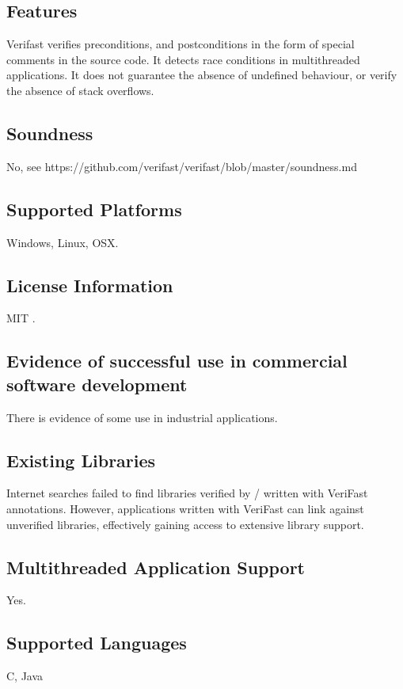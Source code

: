 \documentclass[12pt,openany,a4paper]{book}
\begin{document}
	\subsection{Features}
	Verifast verifies preconditions, and postconditions in the form of special comments in the source code.
	It detects race conditions in multithreaded applications. It does not guarantee the absence of undefined behaviour, or verify the absence of stack overflows.	
	
	\subsection{Soundness}
	No, see https://github.com/verifast/verifast/blob/master/soundness.md
	\subsection{Supported Platforms}
	Windows, Linux, OSX.

	\subsection{License Information} 
	MIT \cite {verifastlicense}.
	\subsection{Evidence of successful use in commercial software development}
	There is evidence of some use in industrial applications\cite{PhilippaertsPieter2014SvwV}.
	\subsection{Existing Libraries}
		Internet searches failed to find libraries verified by / written with VeriFast annotations. However, applications written with VeriFast can link against unverified libraries, effectively gaining access to extensive library support.
	\subsection{Multithreaded Application Support}
	Yes.
	\subsection{Supported Languages}
	C, Java
\end{document}
